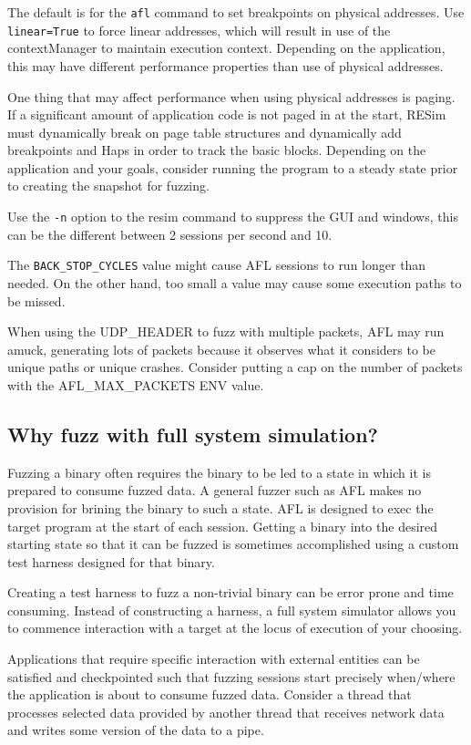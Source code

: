 \documentclass[titlepage]{article}
\begin{document}
The default is for the {\tt afl} command to set breakpoints on physical addresses.  Use {\tt linear=True} to force linear addresses, which will
result in use of the contextManager to maintain execution context.  Depending on the application, this may have different performance properties than 
use of physical addresses.  

One thing that may affect performance when using physical addresses is paging. If a significant amount of application code is not paged in at the
start, RESim must dynamically break on page table structures and dynamically add breakpoints and Haps in order to track the basic blocks.  Depending on
the  application and your goals, consider running the program to a steady state prior to creating the snapshot for fuzzing.

Use the {\tt -n} option to the resim command to suppress the GUI and windows, this can be the different between 2 sessions per second and 10.

The {\tt BACK\_STOP\_CYCLES} value might cause AFL sessions to run longer than needed.  On the other hand, too small a value may cause some
execution paths to be missed.

When using the UDP\_HEADER to fuzz with multiple packets, AFL may run amuck, generating lots of packets because it observes what it considers
to be unique paths or unique crashes.  Consider putting a cap on the number of packets with the AFL\_MAX\_PACKETS ENV value. 


\subsection{Why fuzz with full system simulation?}
Fuzzing a binary often requires the binary to be led to a state in which it is prepared
to consume fuzzed data. A general fuzzer such as AFL makes no provision for brining the 
binary to such a state.  AFL is designed to exec the target program at the start of each
session.  Getting a binary into the desired starting state so that it can be fuzzed is
sometimes accomplished using a custom test harness designed for that binary.

Creating a test harness to fuzz a non-trivial binary can be error prone and time consuming.
Instead of constructing a harness, a full system simulator allows you to commence interaction
with a target at the locus of execution of your choosing.

Applications that require specific interaction with external entities can be satisfied and checkpointed
such that fuzzing sessions start precisely when/where the application is about to consume fuzzed data.
Consider a thread that processes selected data provided by another thread that receives network data
and writes some version of the data to a pipe.
\end{document}
